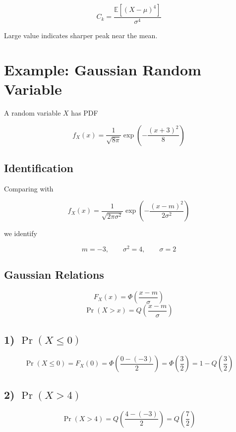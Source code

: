 \documentclass[12pt]{article}
\begin{document}
\[
C_k = \frac{\mathbb{E}[(X-\mu)^4]}{\sigma^4}
\]

Large value indicates sharper peak near the mean.

\section*{Example: Gaussian Random Variable}

A random variable $X$ has PDF

\[
f_X(x) = \frac{1}{\sqrt{8\pi}}
\exp\left(-\frac{(x+3)^2}{8}\right)
\]

\subsection*{Identification}

Comparing with

\[
f_X(x) = \frac{1}{\sqrt{2\pi\sigma^2}}
\exp\left(-\frac{(x-m)^2}{2\sigma^2}\right)
\]

we identify

\[
m=-3, \qquad \sigma^2=4, \qquad \sigma=2
\]

\subsection*{Gaussian Relations}

\[
F_X(x) = \Phi\left(\frac{x-m}{\sigma}\right)
\]
\[
\Pr(X>x)=Q\left(\frac{x-m}{\sigma}\right)
\]

\subsection*{1) $\Pr(X\le 0)$}

\[
\Pr(X\le0)=F_X(0)
=\Phi\left(\frac{0-(-3)}{2}\right)
=\Phi\left(\frac{3}{2}\right)
=1-Q\left(\frac{3}{2}\right)
\]

\subsection*{2) $\Pr(X>4)$}

\[
\Pr(X>4)
=Q\left(\frac{4-(-3)}{2}\right)
=Q\left(\frac{7}{2}\right)
\]
\end{document}
